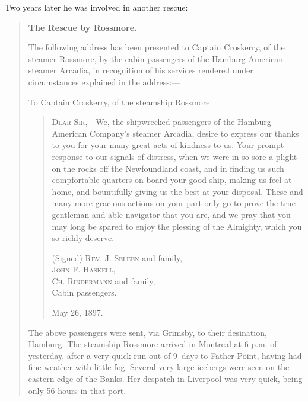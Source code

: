 Two years later he was involved in another rescue:\cite{ArcadiaLetter}

\begin{quotation}
\textbf{The Rescue by Rossmore.}

The following address has been presented to Captain Croskerry, of the steamer Rossmore, by the cabin passengers of the Hamburg-American steamer Arcadia, in recognition of his services rendered under circumstances explained in the address:---

To Captain Croskerry, of the steamship Rossmore:

\begin{quotation}
\textsc{Dear Sir},---We, the shipwrecked passengers of the Hamburg-American Company's steamer Arcadia, desire to express our thanks to you for your many great acts of kindness to us. Your prompt response to our signals of distress, when we were in so sore a plight on the rocks off the Newfoundland coast, and in finding us such compfortable quarters on board your good ship, making us feel at home, and bountifully giving us the best at your disposal. These and many more gracious actions on your part only go to prove the true gentleman and able navigator that you are, and we pray that you may long be spared to enjoy the plessing of the Almighty, which you so richly deserve.


\begin{flushright}
(Signed) \textsc{Rev. J. Seleen} and family, \\
\textsc{John F. Haskell}, \\
\textsc{Ch. Rindermann} and family, \\
Cabin passengers.
\end{flushright}

May 26, 1897.
\end{quotation} 
The above passengers were sent, via Grimsby, to their desination, Hamburg. The steamship Rossmore arrived in Montreal at 6 p.m. of yesterday, after a very quick run out of 9\textonehalf\ days to Father Point, having had fine weather with little fog. Several very large icebergs were seen on the eastern edge of the Banks. Her despatch in Liverpool was very quick, being only 56 hours in that port.
\end{quotation}

